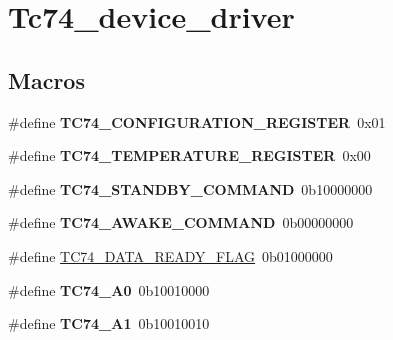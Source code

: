 \hypertarget{group__tc74__device__driver}{\section{Tc74\-\_\-device\-\_\-driver}
\label{group__tc74__device__driver}
}
\subsection*{Macros}
\begin{DoxyCompactItemize}
\item 
\hypertarget{group__tc74__device__driver_ga6ba5fdf8b49e61a58c97feb5bc35f9e3}{\#define {\bfseries T\-C74\-\_\-\-C\-O\-N\-F\-I\-G\-U\-R\-A\-T\-I\-O\-N\-\_\-\-R\-E\-G\-I\-S\-T\-E\-R}~0x01}\label{group__tc74__device__driver_ga6ba5fdf8b49e61a58c97feb5bc35f9e3}

\item 
\hypertarget{group__tc74__device__driver_gae96d6b2a5131b4f3943d894c30fb42fb}{\#define {\bfseries T\-C74\-\_\-\-T\-E\-M\-P\-E\-R\-A\-T\-U\-R\-E\-\_\-\-R\-E\-G\-I\-S\-T\-E\-R}~0x00}\label{group__tc74__device__driver_gae96d6b2a5131b4f3943d894c30fb42fb}

\item 
\hypertarget{group__tc74__device__driver_ga12e2bb5245f9bf9487853ad58c0b1011}{\#define {\bfseries T\-C74\-\_\-\-S\-T\-A\-N\-D\-B\-Y\-\_\-\-C\-O\-M\-M\-A\-N\-D}~0b10000000}\label{group__tc74__device__driver_ga12e2bb5245f9bf9487853ad58c0b1011}

\item 
\hypertarget{group__tc74__device__driver_gad08dad0d1a91b91db4885beeeb645771}{\#define {\bfseries T\-C74\-\_\-\-A\-W\-A\-K\-E\-\_\-\-C\-O\-M\-M\-A\-N\-D}~0b00000000}\label{group__tc74__device__driver_gad08dad0d1a91b91db4885beeeb645771}

\item 
\#define \hyperlink{group__tc74__device__driver_gab77abc7de3ca9f3753905259d339069b}{T\-C74\-\_\-\-D\-A\-T\-A\-\_\-\-R\-E\-A\-D\-Y\-\_\-\-F\-L\-A\-G}~0b01000000
\item 
\hypertarget{group__tc74__device__driver_gacb42e4afeff2b47d5913719f5d70061f}{\#define {\bfseries T\-C74\-\_\-\-A0}~0b10010000}\label{group__tc74__device__driver_gacb42e4afeff2b47d5913719f5d70061f}

\item 
\hypertarget{group__tc74__device__driver_ga5a351f7c5629e674e3d2721ceffd5772}{\#define {\bfseries T\-C74\-\_\-\-A1}~0b10010010}\label{group__tc74__device__driver_ga5a351f7c5629e674e3d2721ceffd5772}


\end{DoxyCompactItemize}
